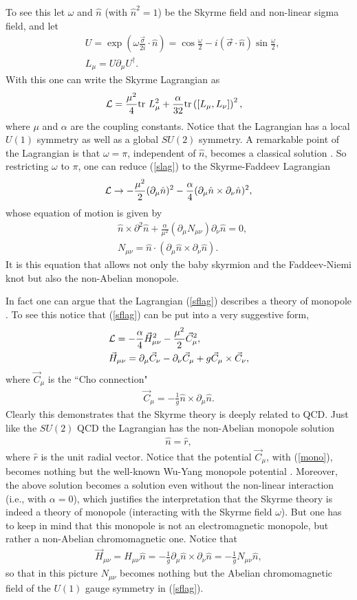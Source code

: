 \documentclass[twocolumn,showpacs,showkeys]{revtex4}
\newcommand{\bea}{\begin{eqnarray}}
\newcommand{\eea}{\end{eqnarray}}
\newcommand{\dfrac}{\displaystyle\frac}
\newcommand{\nn}{\nonumber}
\newcommand{\hn}{\hat n}
\begin{document}
To see this let $\omega$ and $\hat n$
(with ${\hat n}^2 = 1$)
be the Skyrme field and non-linear sigma field,
and let
\bea
&U = \exp (\omega \dfrac{\vec \sigma}{2i} \cdot \hat n)
= \cos \dfrac{\omega}{2} - i (\vec \sigma \cdot \hat n)
\sin \dfrac{\omega}{2}, \nn\\
&L_\mu = U\partial_\mu U^{\dagger}.
\label{su2}
\eea
With this one can write the Skyrme Lagrangian as \cite{skyr}
\bea
&{\cal L} = \dfrac{\mu^2}{4} {\rm tr} ~L_\mu^2 + \dfrac{\alpha}{32}
{\rm tr} \left( \left[ L_\mu, L_\nu \right] \right)^2,
\label{slag}
\eea
where $\mu$ and $\alpha$ are the coupling constants.
Notice that the Lagrangian has a local $U(1)$ symmetry
as well as a global $SU(2)$ symmetry.
A remarkable point of the Lagrangian is that $\omega=\pi$,
independent of $\hn$, becomes a classical solution \cite{cho01}.
So restricting $\omega$ to $\pi$, one can reduce (\ref{slag}) to
the Skyrme-Faddeev Lagrangian
\bea
{\cal L} \rightarrow -\dfrac{\mu^2}{2} (\partial_\mu
\hat n)^2-\dfrac{\alpha}{4}(\partial_\mu \hat n \times
\partial_\nu \hat n)^2,
\label{sflag}
\eea
whose equation of motion is given by
\bea
&\hn \times
\partial^2 \hn + \dfrac{\alpha}{\mu^2} ( \partial_\mu N_{\mu\nu} )
\partial_\nu \hn = 0, \nn\\
&N_{\mu\nu} = \hn \cdot (\partial_\mu \hn \times \partial_\nu \hn).
\label{sfeq}
\eea
It is this equation that allows not only
the baby skyrmion and the Faddeev-Niemi
knot but also the non-Abelian monopole.

In fact one can argue that the Lagrangian (\ref{sflag}) describes
a theory of monopole \cite{cho01,cho02}.
To see this notice that (\ref{sflag}) can be put into a very
suggestive form,
\bea
&{\cal L} = -\dfrac{\alpha}{4} \vec H_{\mu\nu}^2
- \dfrac{\mu^2} {2} \vec C_\mu^2, \nn\\
&\vec H_{\mu\nu} = \partial_\mu \vec C_\nu - \partial_\nu \vec C_\mu
+ g \vec C_\mu \times \vec C_\nu,
\label{qcdlag}
\eea
where $\vec C_\mu$ is the ``Cho connection" \cite{cho80,fadd3,gies,zucc}
\bea
\vec C_\mu = -\dfrac{1}{g} \hn \times \partial_\mu \hn.
\eea
Clearly this demonstrates that the Skyrme theory is
deeply related to QCD. Just like the $SU(2)$ QCD the Lagrangian has
the non-Abelian monopole solution \cite{cho01}
\bea
\hn = \hat r,
\label{mono}
\eea
where $\hat r$ is the unit radial vector.
Notice that the potential $\vec C_\mu$,
with (\ref{mono}), becomes nothing but the well-known
Wu-Yang monopole potential \cite{cho02,cho80}.
Moreover, the above solution becomes a solution even without the
non-linear interaction (i.e., with $\alpha=0$),
which justifies the interpretation that
the Skyrme theory is indeed a theory of monopole (interacting
with the Skyrme field $\omega$). But one has
to keep in mind that this
monopole is not an electromagnetic
monopole, but rather a non-Abelian chromomagnetic one.
Notice that
\bea
\vec H_{\mu\nu} = H_{\mu\nu} \hn = -\dfrac{1}{g}
\partial_\mu \hn \times \partial_\nu \hn
= -\dfrac{1}{g} N_{\mu\nu} \hn,
\eea
so that in this picture $N_{\mu\nu}$ becomes nothing but
the Abelian chromomagnetic field of the $U(1)$ gauge symmetry
in (\ref{sflag}).
\end{document}
